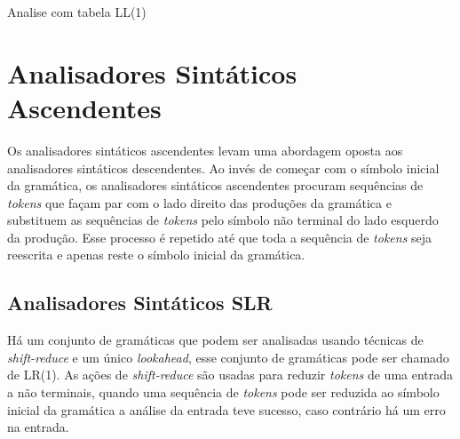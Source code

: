 \begin{algorithm}[htp]
\caption{Analise com tabela LL(1)}\label{alg:lltparse}
\end{algorithm}
\FloatBarrier

\section{Analisadores Sintáticos Ascendentes}
Os analisadores sintáticos ascendentes levam uma abordagem oposta aos analisadores sintáticos descendentes. Ao invés de começar com o símbolo inicial da gramática, os analisadores sintáticos ascendentes procuram sequências de \textit{tokens} que façam par com o lado direito das produções da gramática e substituem as sequências de \textit{tokens} pelo símbolo não terminal do lado esquerdo da produção. Esse processo é repetido até que toda a sequência de \textit{tokens} seja reescrita e apenas reste o símbolo inicial da gramática.

\subsection{Analisadores Sintáticos SLR}

Há um conjunto de gramáticas que podem ser analisadas usando técnicas de \textit{shift-reduce} e um único \textit{lookahead}, esse conjunto de gramáticas pode ser chamado de LR(1). As ações de \textit{shift-reduce} são usadas para reduzir \textit{tokens} de uma entrada a não terminais, quando uma sequência de \textit{tokens} pode ser reduzida ao símbolo inicial da gramática a análise da entrada teve sucesso, caso contrário há um erro na entrada.

